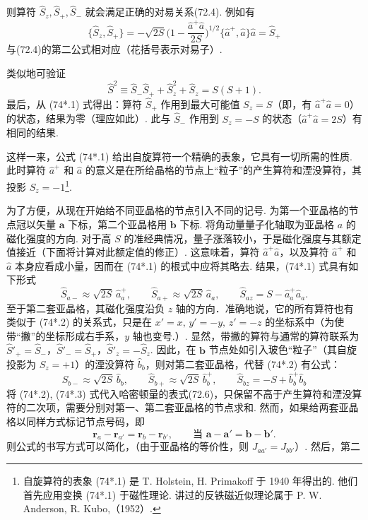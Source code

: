 则算符 $\hat{S}_z,\hat{S}_{+},\hat{S}_{-}$ 就会满足正确的对易关系(72.4). 例如有
\begin{equation*}
\{\hat{S}_z,\hat{S}_{+}\}=-\sqrt{2S}\biggl(1-\frac{\hat{a}^{+}\hat{a}}{2S}\biggr)^{\!1/2}
\{\hat{a}^{+},\hat{a}\}\hat{a}=\hat{S}_{+}
\end{equation*}
与(72.4)的第二公式相对应（花括号表示对易子）.

类似地可验证
\begin{equation*}
\hat{S}^2\equiv\hat{S}_{-}\hat{S}_{+}+\hat{S}_z^2+\hat{S}_z=S(S+1).
\end{equation*}
最后，从 (74*.1) 式得出：算符 $\hat{S}_{+}$ 作用到最大可能值 $S_z=S$（即，有 $\hat{a}^{+}\hat{a}=0$）的状态，结果为零（理应如此）. 此与 $\hat{S}_{-}$ 作用到 $S_z=-S$ 的状态（$\hat{a}^{+}\hat{a}=2S$）有相同的结果.

这样一来，公式 (74*.1) 给出自旋算符一个精确的表象，它具有一切所需的性质. 此时算符 $\hat{a}^{+}$ 和 $\hat{a}$ 的意义是在所给晶格的节点上“粒子”的产生算符和湮没算符，其投影 $S_z=-1$\footnote{自旋算符的表象 (74*.1) 是 T. Holstein, H. Primakoff 于 1940 年得出的. 他们首先应用变换 (74*.1) 于磁性理论. 讲过的反铁磁近似理论属于 P. W. Anderson, R. Kubo,（1952）.}.

为了方便，从现在开始给不同亚晶格的节点引入不同的记号. 为第一个亚晶格的节点冠以矢量 $\bm{a}$ 下标，第二个亚晶格用 $\bm{b}$ 下标. 将角动量量子化轴取为亚晶格 $a$ 的磁化强度的方向. 对于高 $S$ 的准经典情况，量子涨落较小，于是磁化强度与其额定值接近（下面将计算对此额定值的修正）. 这意味着，算符 $\hat{a}^{+}\hat{a}$，以及算符 $\hat{a}^{+}$ 和 $\hat{a}$ 本身应看成小量，因而在 (74*.1) 的根式中应将其略去. 结果，(74*.1) 式具有如下形式
\begin{equation*}
\hat{S}_{a-}\approx\sqrt{2S}\,\hat{a}_a^{+},\qquad
\hat{S}_{a+}\approx\sqrt{2S}\,\hat{a}_a,\qquad
\hat{S}_{az}=S-\hat{a}_a^{+}\hat{a}_a.
\tag{74*.2}
\end{equation*}
至于第二套亚晶格，其磁化强度沿负 $z$ 轴的方向．准确地说，它的所有算符也有类似于 (74*.2) 的关系式，只是在 $x'=x,\,y'=-y,\,z'=-z$ 的坐标系中（为使带“撇”的坐标形成右手系，$y$ 轴也变号.）. 显然，带撇的算符与通常的算符联系为
$\hat{S}'_{+}=\hat{S}_{-}$，$\hat{S}'_{-}=\hat{S}_{+}$，$\hat{S}'_z=-\hat{S}_z$. 因此，在 $\bm{b}$ 节点处如引入玻色“粒子”（其自旋投影为 $S_z=+1$）的湮没算符 $\hat{b}_b$，则对第二套亚晶格，代替 (74*.2) 有公式：
\begin{equation*}
\hat{S}_{b-}\approx\sqrt{2S}\,\hat{b}_b,\qquad
\hat{S}_{b+}\approx\sqrt{2S}\,\hat{b}_b^{+},\qquad
\hat{S}_{bz}=-S+\hat{b}_b^{+}\hat{b}_b
\tag{74*.3}
\end{equation*}
将 (74*.2), (74*.3) 式代入哈密顿量的表式(72.6)，只保留不高于产生算符和湮没算符的二次项，需要分别对第一、第二套亚晶格的节点求和. 然而，如果给两套亚晶格以同样方式标记节点号码，即
\begin{equation*}
\bm{r}_a-\bm{r}_{a'}=\bm{r}_b-\bm{r}_{b'},\qquad
\text{当 }\bm{a}-\bm{a}'=\bm{b}-\bm{b}'.
\end{equation*}
则公式的书写方式可以简化，（由于亚晶格的等价性，则 $J_{aa'}=J_{bb'}$）. 然后，第二

